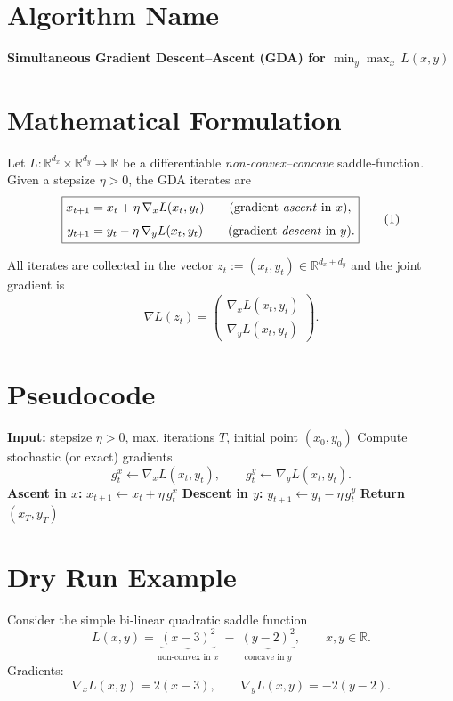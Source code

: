 \documentclass{article}
\begin{document}
\section*{Algorithm Name}
\textbf{Simultaneous Gradient Descent–Ascent (GDA) for $\displaystyle\min_{y}\max_{x}\,L(x,y)$}

\section*{Mathematical Formulation}
Let $L:\mathbb{R}^{d_x}\times\mathbb{R}^{d_y}\rightarrow\mathbb{R}$ be a differentiable \emph{non‑convex–concave} saddle‑function.  
Given a stepsize $\eta>0$, the GDA iterates are
\[
\boxed{
\begin{aligned}
x_{t+1}&=x_{t}+\eta\,\nabla_{x}L(x_{t},y_{t})\qquad\text{(gradient \emph{ascent} in $x$)},\\[4pt]
y_{t+1}&=y_{t}-\eta\,\nabla_{y}L(x_{t},y_{t})\qquad\text{(gradient \emph{descent} in $y$)} .
\end{aligned}}
\tag{1}
\]

All iterates are collected in the vector $z_t:=(x_t,y_t)\in\mathbb{R}^{d_x+d_y}$ and the joint gradient is
\[
\nabla L(z_t)=\begin{pmatrix}\nabla_x L(x_t,y_t)\\[2pt]\nabla_y L(x_t,y_t)\end{pmatrix}.
\]

\section*{Pseudocode}
\begin{algorithm}[H]
\caption{Simultaneous GDA}
\begin{algorithmic}[1]
\STATE \textbf{Input:} stepsize $\eta>0$, max. iterations $T$, initial point $(x_0,y_0)$
    \STATE Compute stochastic (or exact) gradients 
    \[
    g^x_t\gets\nabla_x L(x_t,y_t),\qquad 
    g^y_t\gets\nabla_y L(x_t,y_t).
    \]
    \STATE \textbf{Ascent in $x$:} $x_{t+1}\gets x_t+\eta\,g^x_t$
    \STATE \textbf{Descent in $y$:} $y_{t+1}\gets y_t-\eta\,g^y_t$
\ENDFOR
\STATE \textbf{Return} $(x_T,y_T)$
\end{algorithmic}
\end{algorithm}

\section*{Dry Run Example}
Consider the simple bi‑linear quadratic saddle function
\[
L(x,y)=\underbrace{(x-3)^2}_{\text{non‑convex in }x}
\;-\;\underbrace{(y-2)^2}_{\text{concave in }y},
\qquad x,y\in\mathbb{R}.
\]
Gradients:
\[
\nabla_x L(x,y)=2(x-3),\qquad 
\nabla_y L(x,y)=-2(y-2).
\]
\end{document}
